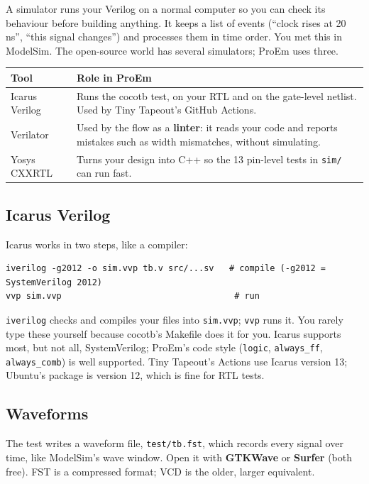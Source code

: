 \documentclass[11pt,a4paper]{article}
\newcommand{\file}[1]{\texttt{#1}}
\newcommand{\cmd}[1]{\texttt{#1}}
\begin{document}
A simulator runs your Verilog on a normal computer so you can check its behaviour before building anything. It keeps a list of events (``clock rises at 20\,ns'', ``this signal changes'') and processes them in time order. You met this in ModelSim. The open-source world has several simulators; ProEm uses three.

\begin{center}
\begin{tabularx}{\linewidth}{@{}lX@{}}
\toprule
Tool & Role in ProEm \\
\midrule
Icarus Verilog & Runs the cocotb test, on your RTL and on the gate-level netlist. Used by Tiny Tapeout's GitHub Actions. \\
Verilator & Used by the flow as a \textbf{linter}: it reads your code and reports mistakes such as width mismatches, without simulating. \\
Yosys CXXRTL & Turns your design into C++ so the 13 pin-level tests in \file{sim/} can run fast. \\
\bottomrule
\end{tabularx}
\end{center}

\subsection{Icarus Verilog}

Icarus works in two steps, like a compiler:

\begin{lstlisting}
iverilog -g2012 -o sim.vvp tb.v src/...sv   # compile (-g2012 = SystemVerilog 2012)
vvp sim.vvp                                  # run
\end{lstlisting}

\cmd{iverilog} checks and compiles your files into \file{sim.vvp}; \cmd{vvp} runs it. You rarely type these yourself because cocotb's Makefile does it for you. Icarus supports most, but not all, SystemVerilog; ProEm's code style (\texttt{logic}, \texttt{always\_ff}, \texttt{always\_comb}) is well supported. Tiny Tapeout's Actions use Icarus version 13; Ubuntu's package is version 12, which is fine for RTL tests.

\subsection{Waveforms}

The test writes a waveform file, \file{test/tb.fst}, which records every signal over time, like ModelSim's wave window. Open it with \textbf{GTKWave} or \textbf{Surfer} (both free). FST is a compressed format; VCD is the older, larger equivalent.
\end{document}
